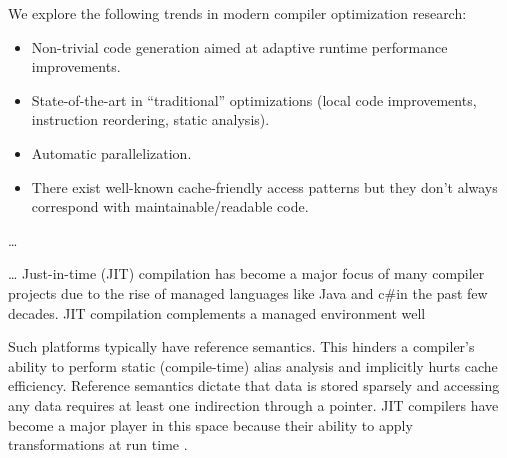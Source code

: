 \documentclass[nobib]{tufte-handout}
\newcommand{\placeholdertext}[1]{
	\noindent{\color{red}{#1}}
}
\newcommand{\csharp}{c\#}
\begin{document}
We explore the following trends in modern compiler optimization research:
\begin{itemize}
\item Non-trivial code generation aimed at adaptive runtime performance improvements.
\item State-of-the-art in ``traditional'' optimizations (local code improvements, instruction reordering, static analysis).
\item Automatic parallelization.
\end{itemize}

\placeholdertext{Desktop computing bottlenecked by memory latency} \newline
\begin{itemize}
\item There exist well-known cache-friendly access patterns but they don't always correspond with maintainable/readable code.
\end{itemize} 
\placeholdertext{Desktop computing bottlenecked by memory latency} \newline
\placeholdertext{Most if not all desktop-related rationale applies to servers.} \newline
\placeholdertext{Additionally, server farms face power consumption problems similar to those that faced by mobile platforms (but for different reasons).}
\placeholdertext{C programmers' expectations about code generation} \ldots

\placeholdertext{JIT compilation} \ldots
Just-in-time (JIT) compilation has become a major focus of many compiler projects due to the rise of managed languages like Java and \csharp in the past few decades.  JIT compilation complements a managed environment well 


Such platforms typically have reference semantics.  This hinders a compiler's ability to perform static (compile-time) alias analysis and implicitly hurts cache efficiency.  Reference semantics dictate that data is stored sparsely and accessing any data requires at least one indirection through a pointer.  JIT compilers have become a major player in this space because their ability to apply transformations at run time \placeholdertext{...}.
\end{document}
